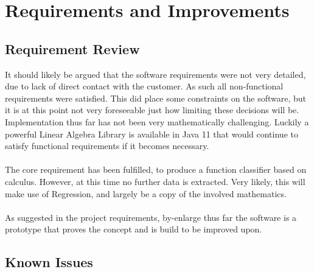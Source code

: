 \documentclass[main.tex]{subfiles}
\begin{document}
  
  \section{Requirements and Improvements}
    
    \subsection{Requirement Review}
      
      It should likely be argued that the software requirements were not very detailed, due to lack of direct contact with the customer. As such all non-functional requirements were satisfied. This did place some constraints on the software, but it is at this point not very foreseeable just how limiting these decisions will be. Implementation thus far has not been very mathematically challenging. Luckily a powerful Linear Algebra Library is available in Java 11 \cite{} that would continue to satisfy functional requirements if it becomes necessary.
      \\\\
      The core requirement has been fulfilled, to produce a function classifier based on calculus. However, at this time no further data is extracted. Very likely, this will make use of Regression, and largely be a copy of the involved mathematics.
      \\\\
      As suggested in the project requirements, by-enlarge thus far the software is a prototype that proves the concept and is build to be improved upon.
      
    \subsection{Known Issues}
      
\end{document}
